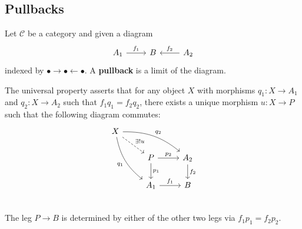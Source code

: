 \documentclass[12pt, oneside]{book}
\begin{document}
\subsection{Pullbacks}
\begin{definition}
    Let $\mathcal{C}$ be a category and given a diagram
    \begin{equation*}
        \begin{tikzcd}
            A_1 \arrow[r,"f_1"]& B&\arrow[l,"f_2"'] A_2
        \end{tikzcd}
    \end{equation*}
    indexed by $\bullet \rightarrow \bullet \leftarrow \bullet$.
    A \textbf{pullback} is a limit of the diagram.

    \begin{remark}
        The universal property asserts that for any object $X$ with morphisms $q_1: X\to A_1$ and $q_2: X\to A_2$ such that $f_1q_1=f_2q_2$, there exists a unique morphism $u: X\to P$ such that the following diagram commutes:
        \begin{equation*}
            \begin{tikzcd}
                X \arrow[ddr,bend right=20,"q_1"']\arrow[drr,bend left=20,"q_2"]\arrow[rd,dashed,"\exists! u"]& &\\
                &P \arrow[d,"p_1"]\arrow[r,"p_2"]&  A_2\arrow[d,"f_2"]\\
                &A_1\arrow[r,"f_1"]&  B\\
            \end{tikzcd}
        \end{equation*}
        The leg $P\to B$ is determined by either of the other two legs via $f_1p_1=f_2p_2$.
    \end{remark}
\end{definition}
\end{document}
